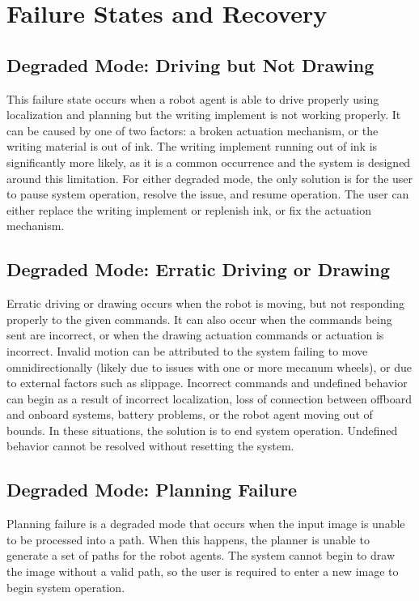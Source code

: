 
\section{Failure States and Recovery}
\label{sec:failure_states}
\subsection{Degraded Mode: Driving but Not Drawing}
This failure state occurs when a robot agent is able to drive properly using localization and planning but the writing implement is not working properly. It can be caused by one of two factors: a broken actuation mechanism, or the writing material is out of ink. The writing implement running out of ink is significantly more likely, as it is a common occurrence and the system is designed around this limitation. For either degraded mode, the only solution is for the user to pause system operation, resolve the issue, and resume operation. The user can either replace the writing implement or replenish ink, or fix the actuation mechanism.

\subsection{Degraded Mode: Erratic Driving or Drawing}
Erratic driving or drawing occurs when the robot is moving, but not responding properly to the given commands. It can also occur when the commands being sent are incorrect, or when the drawing actuation commands or actuation is incorrect. Invalid motion can be attributed to the system failing to move omnidirectionally (likely due to issues with one or more mecanum wheels), or due to external factors such as slippage. Incorrect commands and undefined behavior can begin as a result of incorrect localization, loss of connection between offboard and onboard systems, battery problems, or the robot agent moving out of bounds. In these situations, the solution is to end system operation. Undefined behavior cannot be resolved without resetting the system.

\subsection{Degraded Mode: Planning Failure}
Planning failure is a degraded mode that occurs when the input image is unable to be processed into a path. When this happens, the planner is unable to generate a set of paths for the robot agents. The system cannot begin to draw the image without a valid path, so the user is required to enter a new image to begin system operation.
